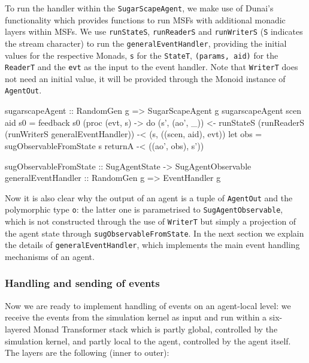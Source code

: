 To run the handler within the \texttt{SugarScapeAgent}, we make use of Dunai's functionality which provides functions to run MSFs with additional monadic layers within MSFs. We use \texttt{runStateS}, \texttt{runReaderS} and \texttt{runWriterS} (\texttt{S} indicates the stream character) to run the \texttt{generalEventHandler}, providing the initial values for the respective Monads, \texttt{s} for the \texttt{StateT}, \texttt{(params, aid)} for the \texttt{ReaderT} and the \texttt{evt} as the input to the event handler. Note that \texttt{WriterT} does not need an initial value, it will be provided through the Monoid instance of \texttt{AgentOut}.

\begin{HaskellCode}
sugarscapeAgent :: RandomGen g => SugarScapeAgent g
sugarscapeAgent scen aid s0 = feedback s0 (proc (evt, s) -> do
  (s', (ao', _)) <- runStateS 
                      (runReaderS 
                        (runWriterS generalEventHandler)) -< (s, ((scen, aid), evt))
  let obs = sugObservableFromState s
  returnA -< ((ao', obs), s'))

sugObservableFromState :: SugAgentState -> SugAgentObservable
generalEventHandler :: RandomGen g => EventHandler g
\end{HaskellCode}

Now it is also clear why the output of an agent is a tuple of \texttt{AgentOut} and the polymorphic type \texttt{o}: the latter one is parametrised to \texttt{SugAgentObservable}, which is not constructed through the use of \texttt{WriterT} but simply a projection of the agent state through \texttt{sugObservableFromState}. In the next section we explain the details of \texttt{generalEventHandler}, which implements the main event handling mechanisms of an agent.

\subsubsection{Handling and sending of events}
Now we are ready to implement handling of events on an agent-local level: we receive the events from the simulation kernel as input and run within a six-layered Monad Transformer stack which is partly global, controlled by the simulation kernel, and partly local to the agent, controlled by the agent itself. The layers are the following (inner to outer):

